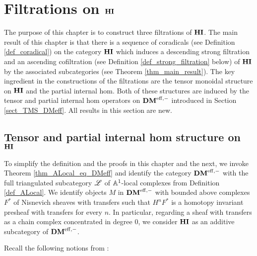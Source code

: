\newpage
\chapter{Filtrations on $\mathbf{HI}$}\label{sect_filtration_hi}

The purpose of this chapter is to construct three filtrations of 
$\mathbf{HI}$. The main result of this chapter is that
there is a sequence of coradicals (see Definition 
\ref{def_coradical}) on the category $\mathbf{HI}$ which induces a 
descending strong filtration and an ascending cofiltration (see 
Definition \ref{def_strong_filtration} below) of $\mathbf{HI}$ by the 
associated subcategories (see Theorem \ref{thm_main_result}). The 
key ingredient in the constructions of the filtrations are the 
tensor monoidal structure on $\mathbf{HI}$ and the partial internal hom. 
Both of these structures are induced by the tensor and partial 
internal hom operators on $\mathbf{DM}^{\mathrm{eff},-}$ introduced in Section 
\ref{sect_TMS_DMeff}. All results in this section are new.

\section{Tensor and partial internal hom structure on $\mathbf{HI}$}

To simplify the definition and the proofs in this chapter and the
next, we invoke Theorem \ref{thm_ALocal_eq_DMeff} and identify the 
category $\mathbf{DM}^{\mathrm{eff},-}$ with the full triangulated subcategory $\mathscr{L}$ 
of $\mathbb{A}^1$-local complexes from Definition \ref{def_ALocal}. We identify 
objects $M$ in $\mathbf{DM}^{\mathrm{eff},-}$ with bounded above complexes $F^*$ of 
Nisnevich sheaves with transfers such that $H^nF^*$ is a homotopy 
invariant presheaf with transfers for every $n$. In particular, 
regarding a sheaf with transfers as a chain complex concentrated 
in degree 0, we consider $\mathbf{HI}$ as an additive subcategory of 
$\mathbf{DM}^{\mathrm{eff},-}$.

Recall the following notions from \cite[1.3]{BBD}:

